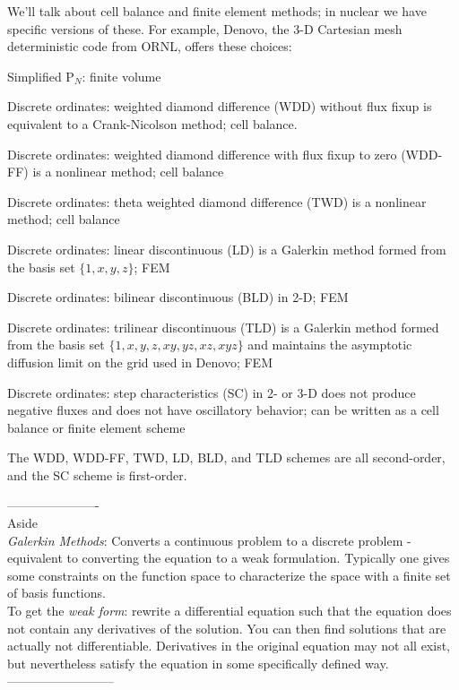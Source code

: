 \documentclass[12pt]{article}
\begin{document}
We'll talk about cell balance and finite element methods; in nuclear we have specific versions of these. For example, Denovo, the 3-D Cartesian mesh deterministic code from ORNL, offers these choices:
\begin{compactitem}
\item Simplified P$_N$: finite volume 
\item Discrete ordinates: weighted diamond difference (WDD) without flux fixup is equivalent to a Crank-Nicolson method; cell balance.
\item Discrete ordinates: weighted diamond difference with flux fixup to zero (WDD-FF)  is a nonlinear method; cell balance 
\item Discrete ordinates: theta weighted diamond difference (TWD)  is a nonlinear method; cell balance
\item Discrete ordinates: linear discontinuous (LD) is a Galerkin method formed from the basis set $\{1,x,y,z\}$; FEM 
\item Discrete ordinates: bilinear discontinuous (BLD) in 2-D; FEM
\item Discrete ordinates: trilinear discontinuous (TLD) is a Galerkin method formed from the basis set $\{1,x,y,z,xy,yz,xz,xyz\}$ and maintains the asymptotic diffusion limit on the grid used in Denovo; FEM
\item Discrete ordinates: step characteristics (SC) in 2- or 3-D does not produce negative fluxes and does not have oscillatory behavior; can be written as a cell balance or finite element scheme
\end{compactitem}
The WDD, WDD-FF, TWD, LD, BLD, and TLD schemes are all second-order, and the SC scheme is first-order.

----------------------\\
Aside\\ 
\emph{Galerkin Methods}: Converts a continuous problem to a discrete problem - equivalent to converting the equation to a weak formulation. Typically one gives some constraints on the function space to characterize the space with a finite set of basis functions.\\

To get the \emph{weak form}: rewrite a differential equation such that the equation does not contain any derivatives of the solution. You can then find solutions that are actually not differentiable. Derivatives in the original equation may not all exist, but nevertheless satisfy the equation in some specifically defined way.\\ %
--------------------------
\end{document}
